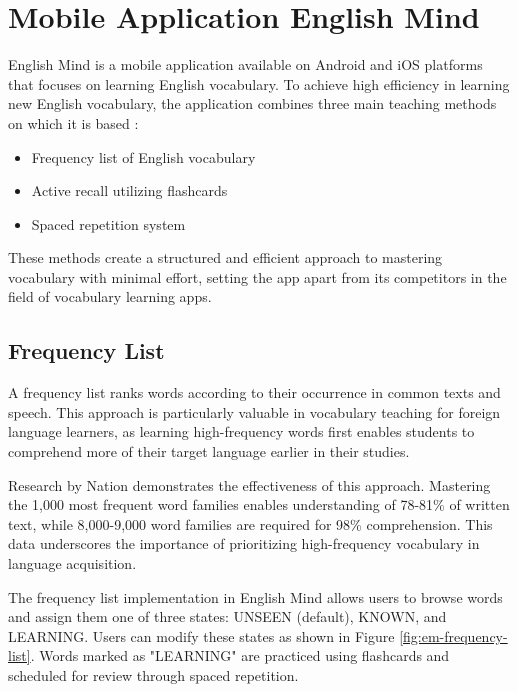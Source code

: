 \chapter{Mobile Application English Mind}
\label{chap:mobile-application-english-mind}

English Mind is a mobile application available on Android \cite{cite:english_mind_play_store} and iOS \cite{cite:english_mind_app_store} platforms that focuses on learning English vocabulary. To achieve high efficiency in learning new English vocabulary, the application combines three main teaching methods on which it is based \cite{cite:english_mind_website}:

\begin{itemize}
    \item Frequency list of English vocabulary
    \item Active recall utilizing flashcards
    \item Spaced repetition system
\end{itemize}

These methods create a structured and efficient approach to mastering vocabulary with minimal effort, setting the app apart from its competitors in the field of vocabulary learning apps.

\section{Frequency List}

A frequency list ranks words according to their occurrence in common texts and speech. This approach is particularly valuable in vocabulary teaching for foreign language learners, as learning high-frequency words first enables students to comprehend more of their target language earlier in their studies.

Research by Nation \cite{cite:nation2006_how_large_vocabulary_is_needed} demonstrates the effectiveness of this approach. Mastering the 1,000 most frequent word families enables understanding of 78-81\% of written text, while 8,000-9,000 word families are required for 98\% comprehension. This data underscores the importance of prioritizing high-frequency vocabulary in language acquisition.\newpage

The frequency list implementation in English Mind allows users to browse words and assign them one of three states: UNSEEN (default), KNOWN, and LEARNING. Users can modify these states as shown in Figure \ref{fig:em-frequency-list}. Words marked as "LEARNING" are practiced using flashcards and scheduled for review through spaced repetition.

